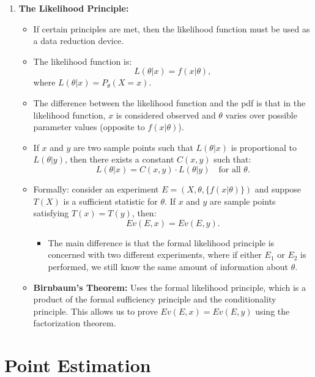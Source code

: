 \documentclass{article}
\begin{document}
\begin{enumerate}
    \item \textbf{The Likelihood Principle:}
    \begin{itemize}
        \item If certain principles are met, then the likelihood function must be used as a data reduction device.
        \item The likelihood function is:
        \[
        L(\theta|x) = f(x|\theta),
        \]
        where \(L(\theta|x) = P_\theta(X = x)\).
        \item The difference between the likelihood function and the pdf is that in the likelihood function, \(x\) is considered observed and \(\theta\) varies over possible parameter values (opposite to \(f(x|\theta)\)).
        \item If \(x\) and \(y\) are two sample points such that \(L(\theta|x)\) is proportional to \(L(\theta|y)\), then there exists a constant \(C(x, y)\) such that:
        \[
        L(\theta|x) = C(x, y) \cdot L(\theta|y) \quad \text{for all } \theta.
        \]
        \item Formally: consider an experiment \(E = (X, \theta, \{f(x|\theta)\})\) and suppose \(T(X)\) is a sufficient statistic for \(\theta\). If \(x\) and \(y\) are sample points satisfying \(T(x) = T(y)\), then:
        \[
        Ev(E, x) = Ev(E, y).
        \]
        \begin{itemize}
            \item The main difference is that the formal likelihood principle is concerned with two different experiments, where if either \(E_1\) or \(E_2\) is performed, we still know the same amount of information about \(\theta\).
        \end{itemize}
        \item \textbf{Birnbaum's Theorem:} Uses the formal likelihood principle, which is a product of the formal sufficiency principle and the conditionality principle. This allows us to prove \(Ev(E, x) = Ev(E, y)\) using the factorization theorem.
    \end{itemize}
\end{enumerate}

\section{Point Estimation}
\end{document}
